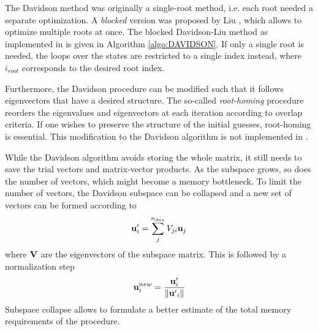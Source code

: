 The Davidson method was originally a single-root method, i.e. each root needed a separate optimization. A \emph{blocked} version was proposed by Liu \cite{Liu1978}, which allows to optimize multiple roots at once. The blocked Davidson-Liu method as implemented in \mchem{} is given in Algorithm \ref{algo:DAVIDSON}. If only a single root is needed, the loops over the states are restricted to a single index instead, where $i_{root}$ corresponds to the desired root index. 

Furthermore, the Davidson procedure can be modified such that it follows eigenvectors that have a desired structure. The so-called \emph{root-homing} procedure \cite{But1976} reorders the eigenvalues and eigenvectors at each iteration according to overlap criteria. If one wishes to preserve the structure of the initial guesses, root-homing is essential. This modification to the Davidson algorithm is not implemented in \mchem{}.

While the Davidson algorithm avoids storing the whole matrix, it still needs to save the trial vectors and matrix-vector products. As the subspace grows, so does the number of vectors, which might become a memory bottleneck. To limit the number of vectors, the Davidson subspace can be collapsed and a new set of vectors can be formed according to
\begin{equation}
\mathbf{u}'_i = \sum_j^{n_{dav}} V_{ji} \mathbf{u}_j
\label{eq:COLLAPSE1} 
\end{equation}
\noindent where $\mathbf{V}$ are the eigenvectors of the subspace matrix. This is followed by a normalization step
\begin{equation}
\mathbf{u}^{new}_i = \frac{\mathbf{u}'_i}{\left\lVert \mathbf{u'}_i \right\rVert}
\label{eq:COLLAPSE2}
\end{equation}
\noindent Subspace collapse allows to formulate a better estimate of the total memory requirements of the procedure. 

